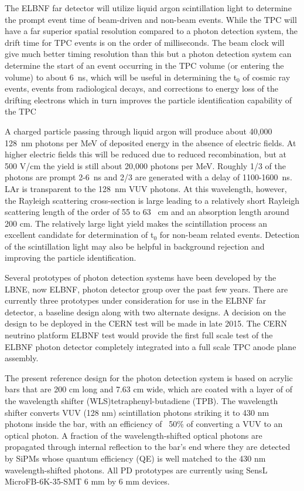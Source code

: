 



The ELBNF far detector will utilize liquid argon scintillation light to determine the prompt event time of beam-driven and non-beam events. While the TPC will have a far superior spatial resolution compared to a photon detection system, the drift time for TPC events is on the order of milliseconds. The beam clock will give much better timing resolution than this but a photon detection system can determine the start of an event occurring in the TPC volume (or entering the volume) to about 6~ns, which will be useful in determining the t$_0$ of cosmic ray events, events from radiological decays, and corrections to energy loss of the drifting electrons which in turn improves the particle identification capability of the TPC

A charged particle passing through liquid argon will produce about 40,000 128~nm photons per MeV of deposited energy in the absence of electric fields. At higher electric fields this will be reduced due to reduced recombination, but at 500 V/cm the yield is still about 20,000 photons per MeV. Roughly 1/3 of the photons are prompt 2-6~ns and 2/3 are generated with a delay of 1100-1600~ns. LAr is transparent to the 128~nm VUV photons. At this wavelength, however, the Rayleigh scattering cross-section is large leading to a relatively short Rayleigh scattering length of the order of 55 to 63 ~cm and an absorption length around 200 cm. The relatively large light yield makes the scintillation process an excellent candidate for determination of t$_0$ for non-beam related events. Detection of the scintillation light may also be helpful in background rejection and improving the particle identification.

Several prototypes of photon detection systems have been developed by the LBNE, now ELBNF, photon detector group over the past few years. There are currently three prototypes under consideration for use in the ELBNF far detector, a baseline design along with two alternate designs. A decision on the design to be deployed in the CERN test will be made in late 2015. The CERN neutrino platform ELBNF test would provide the first full scale test of the ELBNF photon detector completely integrated into a full scale TPC anode plane assembly. 

The present reference design for the photon detection system is based on acrylic bars that are 200 cm long and 7.63 cm wide, which are coated with a layer of of the wavelength shifter (WLS)tetraphenyl-butadiene (TPB). The wavelength shifter converts VUV (128 nm) scintillation photons striking it to 430 nm photons inside the bar, with an efficiency of ~50\% of converting a VUV to an optical photon.  A fraction of the wavelength-shifted optical photons are propagated through internal reflection to the bar's end where they are detected by SiPMs whose quantum efficiency (QE) is well matched to the 430 nm wavelength-shifted photons. All PD prototypes are currently using SensL MicroFB-6K-35-SMT 6 mm by 6 mm devices. 


